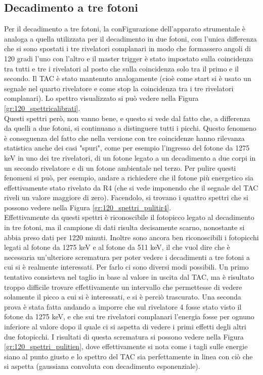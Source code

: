 \subsection{Decadimento a tre fotoni}
Per il decadimento a tre fotoni, la conFigurazione dell'apparato strumentale è analoga a quella utilizzata per il decadimento in due fotoni, con l'unica differenza
che si sono spostati i tre rivelatori complanari in modo che formassero angoli di 120 gradi l'uno  con l'altro e il master trigger è stato impostato sulla coincidenza
tra tutti e tre i rivelatori al posto che sulla coincidenza solo tra il primo e il secondo. Il TAC è stato mantenuto analogamente (cioè come start si è usato un segnale
nel quarto rivelatore e come stop la coincidenza tra i tre rivelatori complanari). Lo spettro visualizzato si può vedere nella Figura \ref{gr:120_spettricalibrati}.\\


Questi spettri però, non vanno bene, e questo si vede dal fatto che, a differenza da quelli a due fotoni, si continuano a distinguere tutti i picchi. Questo fenomeno
è conseguenza del fatto che nella versione con tre coincidenze hanno rilevanza statistica anche dei casi "spuri", come per esempio l'ingresso del fotone da 1275 keV in uno dei tre rivelatori,
di un fotone legato a un decadimento a due corpi in un secondo rivelatore e di un fotone ambientale nel terzo. Per pulire questi fenomeni si può, per esempio, andare a
richiedere che il fotone più energetico sia effettivamente stato rivelato da R4 (che si vede imponendo che il segnale del TAC riveli un valore maggiore di zero). Facendolo,
si trovano i quattro spettri che si possono vedere nella Figura \ref{gr:120_spettri_pulitir4}.\\


Effettivamente da questi spettri è riconoscibile il fotopicco legato al decadimento in tre fotoni, ma il campione di dati risulta decisamente scarno, nonostante si abbia
preso dati per 1220 minuti. Inoltre sono ancora ben riconoscibili i fotopicchi legati al fotone da 1275 keV e al fotone da 511 keV, il che vuol dire che è necessaria 
un'ulteriore scrematura per poter vedere i decadimenti a tre fotoni a cui si è realmente interessati. Per farlo ci sono diversi modi possibili. Un primo tentativo consisteva
nel taglio in base al valore in uscita dal TAC, ma è risultato troppo difficile trovare effettivamente un intervallo che permettesse di vedere solamente il picco a cui
si è interessati, e si è perciò trascurato. Una seconda prova è stata fatta andando a imporre che sul rivelatore 4 fosse stato visto il fotone da 1275 keV, e che sui tre
rivelatori complanari l'energia fosse per ognuno inferiore al valore dopo il quale ci si aspetta di vedere i primi effetti degli altri due fotopicchi. I risultati
di questa scrematura si possono vedere nella Figura \ref{gr:120_spettri_pulitien}, dove effettivamente si nota come i tagli sulle energie siano al punto giusto e lo
spettro del TAC sia perfettamente in linea con ciò che si aspetta (gaussiana convoluta con decadimento esponenziale).\\


